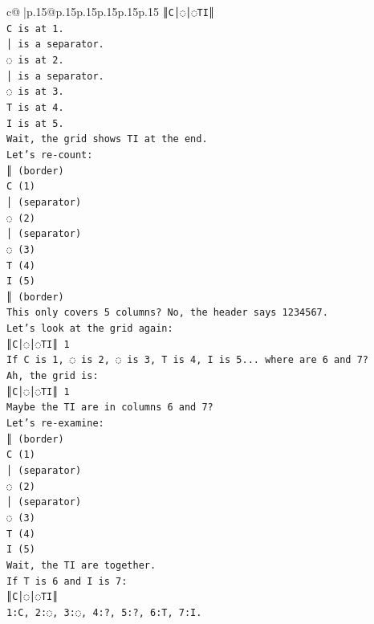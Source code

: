 \documentclass{article}
\begin{document}
{\begin{supertabular}{c@{$\;$}|p{.15\linewidth}@{}p{.15\linewidth}p{.15\linewidth}p{.15\linewidth}p{.15\linewidth}p{.15\linewidth}}
{{{\texttt{║C│◌│◌TI║} \\
\texttt{C is at 1.} \\
\texttt{│ is a separator.} \\
\texttt{◌ is at 2.} \\
\texttt{│ is a separator.} \\
\texttt{◌ is at 3.} \\
\texttt{T is at 4.} \\
\texttt{I is at 5.} \\
\texttt{Wait, the grid shows TI at the end.} \\
\texttt{Let's re{-}count:} \\
\texttt{║ (border)} \\
\texttt{C (1)} \\
\texttt{│ (separator)} \\
\texttt{◌ (2)} \\
\texttt{│ (separator)} \\
\texttt{◌ (3)} \\
\texttt{T (4)} \\
\texttt{I (5)} \\
\texttt{║ (border)} \\
\texttt{This only covers 5 columns? No, the header says 1234567.} \\
\texttt{Let's look at the grid again:} \\
\texttt{║C│◌│◌TI║ 1} \\
\texttt{If C is 1, ◌ is 2, ◌ is 3, T is 4, I is 5... where are 6 and 7?} \\
\texttt{Ah, the grid is:} \\
\texttt{║C│◌│◌TI║ 1} \\
\texttt{Maybe the TI are in columns 6 and 7?} \\
\texttt{Let's re{-}examine:} \\
\texttt{║ (border)} \\
\texttt{C (1)} \\
\texttt{│ (separator)} \\
\texttt{◌ (2)} \\
\texttt{│ (separator)} \\
\texttt{◌ (3)} \\
\texttt{T (4)} \\
\texttt{I (5)} \\
\texttt{Wait, the TI are together.} \\
\texttt{If T is 6 and I is 7:} \\
\texttt{║C│◌│◌TI║} \\
\texttt{1:C, 2:◌, 3:◌, 4:?, 5:?, 6:T, 7:I.} \\
}}}
\end{supertabular}}
\end{document}
